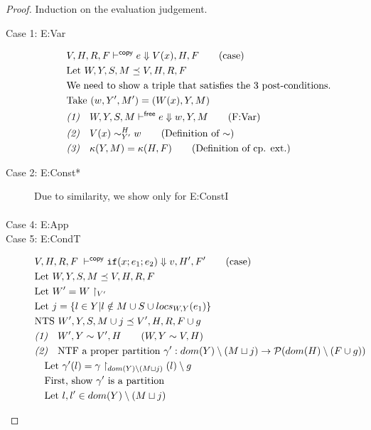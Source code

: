 \documentclass[11pt]{article}
\newcommand{\veq}[4]{#3 \sim^{#1}_{#2} #4}
\theoremstyle{definition}
\begin{document}
\begin{proof}
Induction on the evaluation judgement.\\
\begin{description}
  \item[Case 1: E:Var]
  \begin{align*}
		&V,H,R,F \vdash^{\mathsf{copy}} e \Downarrow V(x),H,F \tag{case}\\
		&\text{Let } W,Y,S,M \preceq V,H,R,F\\
		&\text{We need to show a triple that satisfies the 3 post-conditions.}\\
		&\text{Take } (w,Y', M') = (W(x),Y,M)\\
		&\emph{(1)}\quad W,Y,S,M \vdash^{\mathsf{free}} e \Downarrow w,Y,M \tag{F:Var}\\
		&\emph{(2)}\quad  \veq{H}{Y'}{V(x)}{w} \tag{Definition of $\sim$}\\
		&\emph{(3)}\quad \kappa(Y,M) = \kappa(H,F) \tag{Definition of cp. ext.}\\
  \end{align*}
  \item[Case 2: E:Const*]
  Due to similarity, we show only for E:ConstI
  \begin{align*}
  \end{align*}
  \item[Case 4: E:App]
  \item[Case 5: E:CondT]
  \begin{align*}
		&V,H,R,F \; \vdash^{\mathsf{copy}} \ifexabt{x}{e_1}{e_2} \Downarrow v, H',F' \tag{case}\\
		&\text{Let } W,Y,S,M \preceq V,H,R,F \\
		&\text{Let } W' = W \restriction_{V'}\\
		&\text{Let } j = \{l \in Y | l \notin M \cup S \cup locs_{W,Y}(e_1) \}\\
		&\text{NTS } W',Y,S,M \cup j \preceq V',H,R,F \cup g\\
		&\emph{(1)}\quad W',Y \sim V',H \tag{$W,Y \sim V,H$}\\
		&\emph{(2)}\quad \text{NTF a proper partition }
		 \gamma' : dom(Y) \setminus (M \sqcup j) \to \mathcal{P}(dom(H)\setminus (F \cup g))  \\
		&\quad \text{Let } \gamma'(l) = \gamma \restriction_{dom(Y)\setminus(M \sqcup j)}(l) \setminus g\\
		&\quad \text{First, show $\gamma'$ is a partition}\\
		&\quad \text{Let } l, l' \in dom(Y) \setminus (M \sqcup j)\\

\end{align*}
\end{description}
\end{proof}
\end{document}
